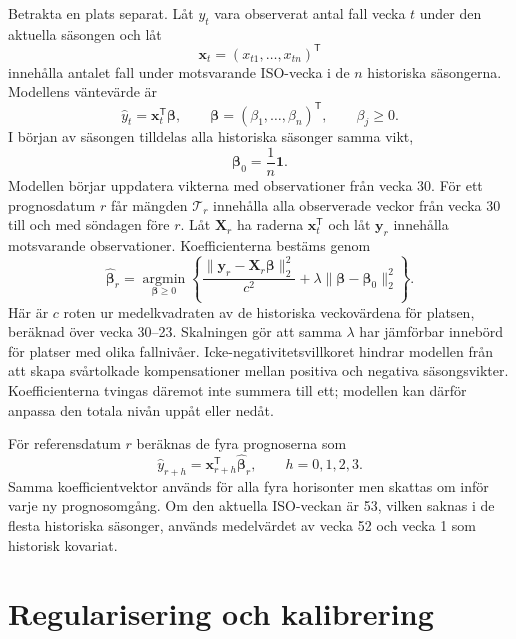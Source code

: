 \documentclass[10pt,a4paper]{article}
\begin{document}
Betrakta en plats separat. Låt $y_t$ vara observerat antal fall vecka $t$
under den aktuella säsongen och låt
\[
  \mathbf{x}_t=(x_{t1},\ldots,x_{tn})^{\mathsf T}
\]
innehålla antalet fall under motsvarande ISO-vecka i de $n$ historiska
säsongerna. Modellens väntevärde är
\begin{equation}
  \widehat y_t = \mathbf{x}_t^{\mathsf T}\boldsymbol\beta,
  \qquad \boldsymbol\beta=(\beta_1,\ldots,\beta_n)^{\mathsf T},
  \qquad \beta_j\geq 0.
  \label{eq:forecast}
\end{equation}
I början av säsongen tilldelas alla historiska säsonger samma vikt,
\begin{equation}
  \boldsymbol\beta_0=\frac{1}{n}\mathbf{1}.
  \label{eq:prior}
\end{equation}
Modellen börjar uppdatera vikterna med observationer från vecka 30. För ett
prognosdatum $r$ får mängden $\mathcal T_r$ innehålla alla observerade veckor
från vecka 30 till och med söndagen före $r$. Låt $\mathbf X_r$ ha raderna
$\mathbf{x}_t^{\mathsf T}$ och låt $\mathbf y_r$ innehålla motsvarande
observationer. Koefficienterna bestäms genom
\begin{equation}
  \widehat{\boldsymbol\beta}_r=
  \underset{\boldsymbol\beta\geq0}{\operatorname{argmin}}
  \left\{
  \frac{\lVert\mathbf y_r-\mathbf X_r\boldsymbol\beta\rVert_2^2}{c^2}
  +\lambda\lVert\boldsymbol\beta-\boldsymbol\beta_0\rVert_2^2
  \right\}.
  \label{eq:ridge}
\end{equation}
Här är $c$ roten ur medelkvadraten av de historiska veckovärdena för platsen,
beräknad över vecka 30--23. Skalningen gör att samma $\lambda$ har jämförbar
innebörd för platser med olika fallnivåer. Icke-negativitetsvillkoret hindrar
modellen från att skapa svårtolkade kompensationer mellan positiva och
negativa säsongsvikter. Koefficienterna tvingas däremot inte summera till ett;
modellen kan därför anpassa den totala nivån uppåt eller nedåt.

För referensdatum $r$ beräknas de fyra prognoserna som
\begin{equation}
  \widehat y_{r+h}=\mathbf{x}_{r+h}^{\mathsf T}
  \widehat{\boldsymbol\beta}_r,\qquad h=0,1,2,3.
  \label{eq:horizons}
\end{equation}
Samma koefficientvektor används för alla fyra horisonter men skattas om inför
varje ny prognosomgång. Om den aktuella ISO-veckan är 53, vilken saknas i de
flesta historiska säsonger, används medelvärdet av vecka 52 och vecka 1 som
historisk kovariat.

\section*{Regularisering och kalibrering}
\end{document}
